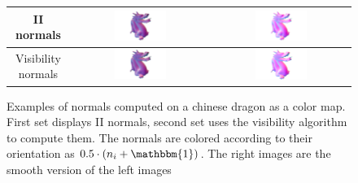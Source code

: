 \documentclass[runningheads]{llncs}
\begin{document}
    \begin{figure}
        \centering
        \begin{tabular}{|c||c|c|}
            \hline
            II normals &
            \includegraphics[width=0.4\textwidth]{pictures/chinese-dragon-normal-estimation-cubes-II} &
            \includegraphics[width=0.4\textwidth]{pictures/chinese-dragon-normal-estimation-smooth-II} \\
            \hline
            Visibility normals &
            \includegraphics[width=0.4\textwidth]{pictures/chinese-dragon-normal-estimation-cubes-NV} &
            \includegraphics[width=0.4\textwidth]{pictures/chinese-dragon-normal-estimation-smooth-NV} \\
            \hline
        \end{tabular}
        \caption{Examples of normals computed on a chinese dragon as a
          color map. First set displays II normals, second set uses
          the visibility algorithm to compute them. The normals are
          colored according to their orientation as $0.5 \cdot (n_i +
          \mathbbm{1})$. The right images are the smooth version of
          the left images}
        \label{fig:normals-estimation}
    \end{figure}
\end{document}
